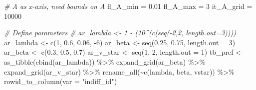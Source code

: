 \documentclass[
]{book}
\newenvironment{Shaded}{\begin{snugshade}}{\end{snugshade}}
\newcommand{\AttributeTok}[1]{\textcolor[rgb]{0.77,0.63,0.00}{#1}}
\newcommand{\CommentTok}[1]{\textcolor[rgb]{0.56,0.35,0.01}{\textit{#1}}}
\newcommand{\DecValTok}[1]{\textcolor[rgb]{0.00,0.00,0.81}{#1}}
\newcommand{\FloatTok}[1]{\textcolor[rgb]{0.00,0.00,0.81}{#1}}
\newcommand{\FunctionTok}[1]{\textcolor[rgb]{0.00,0.00,0.00}{#1}}
\newcommand{\NormalTok}[1]{#1}
\newcommand{\OtherTok}[1]{\textcolor[rgb]{0.56,0.35,0.01}{#1}}
\newcommand{\SpecialCharTok}[1]{\textcolor[rgb]{0.00,0.00,0.00}{#1}}
\newcommand{\StringTok}[1]{\textcolor[rgb]{0.31,0.60,0.02}{#1}}
\begin{document}
\begin{Shaded}
\begin{Highlighting}[]
\CommentTok{\# A as x{-}axis, need bounds on A}
\NormalTok{fl\_A\_min }\OtherTok{=} \FloatTok{0.01}
\NormalTok{fl\_A\_max }\OtherTok{=} \DecValTok{3}
\NormalTok{it\_A\_grid }\OtherTok{=} \DecValTok{10000}

\CommentTok{\# Define parameters}
\CommentTok{\# ar\_lambda \textless{}{-} 1 {-} (10\^{}(c(seq({-}2,2, length.out=3))))}
\NormalTok{ar\_lambda }\OtherTok{\textless{}{-}} \FunctionTok{c}\NormalTok{(}\DecValTok{1}\NormalTok{, }\FloatTok{0.6}\NormalTok{, }\FloatTok{0.06}\NormalTok{, }\SpecialCharTok{{-}}\DecValTok{6}\NormalTok{)}
\NormalTok{ar\_beta }\OtherTok{\textless{}{-}} \FunctionTok{seq}\NormalTok{(}\FloatTok{0.25}\NormalTok{, }\FloatTok{0.75}\NormalTok{, }\AttributeTok{length.out =} \DecValTok{3}\NormalTok{)}
\NormalTok{ar\_beta }\OtherTok{\textless{}{-}} \FunctionTok{c}\NormalTok{(}\FloatTok{0.3}\NormalTok{, }\FloatTok{0.5}\NormalTok{, }\FloatTok{0.7}\NormalTok{)}
\NormalTok{ar\_v\_star }\OtherTok{\textless{}{-}} \FunctionTok{seq}\NormalTok{(}\DecValTok{1}\NormalTok{, }\DecValTok{2}\NormalTok{, }\AttributeTok{length.out =} \DecValTok{1}\NormalTok{)}
\NormalTok{tb\_pref }\OtherTok{\textless{}{-}} \FunctionTok{as\_tibble}\NormalTok{(}\FunctionTok{cbind}\NormalTok{(ar\_lambda)) }\SpecialCharTok{\%\textgreater{}\%} 
  \FunctionTok{expand\_grid}\NormalTok{(ar\_beta) }\SpecialCharTok{\%\textgreater{}\%} \FunctionTok{expand\_grid}\NormalTok{(ar\_v\_star) }\SpecialCharTok{\%\textgreater{}\%} 
  \FunctionTok{rename\_all}\NormalTok{(}\SpecialCharTok{\textasciitilde{}}\FunctionTok{c}\NormalTok{(}\StringTok{\textquotesingle{}lambda\textquotesingle{}}\NormalTok{, }\StringTok{\textquotesingle{}beta\textquotesingle{}}\NormalTok{, }\StringTok{\textquotesingle{}vstar\textquotesingle{}}\NormalTok{)) }\SpecialCharTok{\%\textgreater{}\%} 
  \FunctionTok{rowid\_to\_column}\NormalTok{(}\AttributeTok{var =} \StringTok{"indiff\_id"}\NormalTok{)}


\end{Highlighting}
\end{Shaded}
\end{document}
